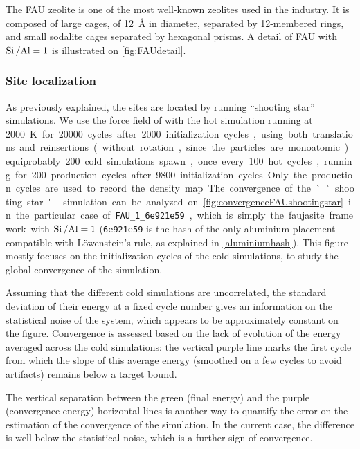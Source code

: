 \documentclass[main.tex]{subfiles}
\begin{document}
The FAU zeolite is one of the most well-known zeolites used in the industry. It is composed of large cages, of \qty{12}{\angstrom} in diameter, separated by 12-membered rings, and small sodalite cages separated by hexagonal prisms. A detail of FAU with $\mbox{Si\,/Al} = 1$ is illustrated on \cref{fig:FAUdetail}.

\subsubsection{Site localization}

As previously explained, the sites are located by running ``shooting star'' simulations. We use the force field of \textcite{BoulfelfelSholl2021} with the hot simulation running at \qty{2000}K for \num{20000} cycles after \num{2000} initialization cycles, using both translations and reinsertions (without rotation, since the particles are monoatomic) equiprobably. \num{200} cold simulations spawn, once every \num{100} hot cycles, running for \num{200} production cycles after \num{9800} initialization cycles. Only the production cycles are used to record the density map.

The convergence of the ``shooting star'' simulation can be analyzed on \cref{fig:convergenceFAUshootingstar} in the particular case of \texttt{FAU\_1\_6e921e59}, which is simply the faujasite framework with $\mbox{Si\,/Al} = 1$ (\texttt{6e921e59} is the hash of the only aluminium placement compatible with L\"owenstein's rule, as explained in \cref{aluminiumhash}). This figure mostly focuses on the initialization cycles of the cold simulations, to study the global convergence of the simulation.

Assuming that the different cold simulations are uncorrelated, the standard deviation of their energy at a fixed cycle number gives an information on the statistical noise of the system, which appears to be approximately constant on the figure. Convergence is assessed based on the lack of evolution of the energy averaged across the cold simulations: the vertical purple line marks the first cycle from which the slope of this average energy (smoothed on a few cycles to avoid artifacts) remains below a target bound.

The vertical separation between the green (final energy) and the purple (convergence energy) horizontal lines is another way to quantify the error on the estimation of the convergence of the simulation. In the current case, the difference is well below the statistical noise, which is a further sign of convergence.
\end{document}
